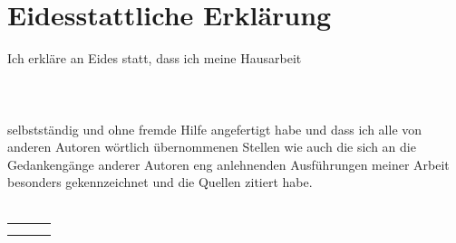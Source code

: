 
\section*{Eidesstattliche Erklärung}

Ich erkläre an Eides statt, dass ich meine Hausarbeit \\ \\
\titel \\ \\
selbstständig und ohne fremde Hilfe angefertigt habe und dass ich alle von anderen Autoren wörtlich übernommenen Stellen wie auch die sich an die Gedankengänge anderer Autoren eng anlehnenden Ausführungen meiner Arbeit besonders gekennzeichnet und die Quellen zitiert habe.
\\ \\

\begin{tabular}{ p{6cm} p{3cm} p{6cm} }
	& & \\\cline{1-1}\cline{3-3}
	\makebox[6cm]{Ort, Datum} & \makebox[3cm]{} & \makebox[6cm]{Unterschrift}
\end{tabular}